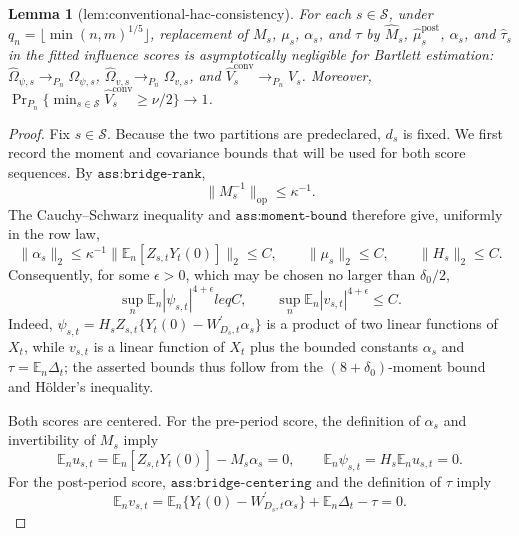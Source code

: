 \documentclass{article}
\newtheorem{lemma}{Lemma}
\begin{document}
\begin{lemma}[lem:conventional-hac-consistency]\label{lem:conventional-hac-consistency}
For each \(s\in\mathcal S\), under \(q_n=\lfloor\min(n,m)^{1/5}\rfloor\), replacement of \(M_s\), \(\mu_s\), \(\alpha_s\), and \(\tau\) by \(\widehat M_s\), \(\widehat\mu_s^{\mathrm{post}}\), \(\widehat\alpha_s\), and \(\widehat\tau_s\) in the fitted influence scores is asymptotically negligible for Bartlett estimation: \(\widehat\Omega_{\psi,s}\to_{P_n}\Omega_{\psi,s}\), \(\widehat\Omega_{v,s}\to_{P_n}\Omega_{v,s}\), and \(\widehat V_s^{\mathrm{conv}}\to_{P_n}V_s\). Moreover, \(\Pr_{P_n}\{\min_{s\in\mathcal S}\widehat V_s^{\mathrm{conv}}\geq\nu/2\}\to1\).
\end{lemma}
\begin{proof}
Fix \(s\in\mathcal S\).  Because the two partitions are predeclared, \(d_s\) is fixed.  We first record the moment and covariance bounds that will be used for both score sequences.  By \(\texttt{ass:bridge-rank}\),
\[
 \lVert M_s^{-1}\rVert_{\mathrm{op}}\leq \kappa^{-1}.
\]
The Cauchy--Schwarz inequality and \(\texttt{ass:moment-bound}\) therefore give, uniformly in the row law,
\[
 \lVert\alpha_s\rVert_2
 \leq \kappa^{-1}\lVert\mathbb E_n[Z_{s,t}Y_t(0)]\rVert_2\leq C,
 \qquad
 \lVert\mu_s\rVert_2\leq C,
 \qquad
 \lVert H_s\rVert_2\leq C.
\]
Consequently, for some \(\epsilon>0\), which may be chosen no larger than \(\delta_0/2\),
\[
 \sup_n\mathbb E_n|\psi_{s,t}|^{4+\epsilon}leq C,
 \qquad
 \sup_n\mathbb E_n|v_{s,t}|^{4+\epsilon}\leq C.                                      \tag{1}
\]
Indeed, \(\psi_{s,t}=H_sZ_{s,t}\{Y_t(0)-W_{D_s,t}^{\prime}\alpha_s\}\) is a product of two linear functions of \(X_t\), while \(v_{s,t}\) is a linear function of \(X_t\) plus the bounded constants \(\alpha_s\) and \(\tau=\mathbb E_n\Delta_t\); the asserted bounds thus follow from the \((8+\delta_0)\)-moment bound and H\"older's inequality.

Both scores are centered.  For the pre-period score, the definition of \(\alpha_s\) and invertibility of \(M_s\) imply
\[
 \mathbb E_n u_{s,t}
 =\mathbb E_n[Z_{s,t}Y_t(0)]-M_s\alpha_s=0,
 \qquad
 \mathbb E_n\psi_{s,t}=H_s\mathbb E_nu_{s,t}=0.                                    \tag{2}
\]
For the post-period score, \(\texttt{ass:bridge-centering}\) and the definition of \(\tau\) imply
\[
 \mathbb E_nv_{s,t}
 =\mathbb E_n\{Y_t(0)-W_{D_s,t}^{\prime}\alpha_s\}
  +\mathbb E_n\Delta_t-\tau=0.                                                       \tag{3}
\]


\end{proof}
\end{document}
